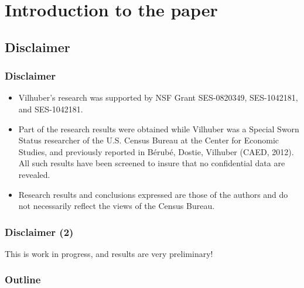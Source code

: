 
%
%  
%
\section[Introduction]{Introduction to the paper}

\subsection[Disclaimer]{Disclaimer}

\begin{slide}
\frametitle{Disclaimer}
\footnotesize
  \begin{itemize}
  \item Vilhuber's research was supported by NSF Grant SES-0820349, SES-1042181, and SES-1042181. 
  \item Part of the research results were obtained while Vilhuber was a
    Special Sworn Status researcher of the U.S. Census Bureau at the
    Center for Economic Studies, and previously reported in B\'erub\'e, Dostie, Vilhuber (CAED, 2012).  
    All such results have been screened to insure that no confidential data are revealed. 
  \item  Research results and conclusions expressed are those of the authors and
    do not necessarily reflect the views of the Census Bureau. 

  \end{itemize}
\end{slide}

\begin{slide}
\frametitle{Disclaimer (2)}
\begin{center}
\large    This is work in progress, and results are very preliminary!

\end{center}
\end{slide}

\begin{slide}

  \frametitle{Outline}
  \tableofcontents[part=1,hideallsubsections]
\end{slide}



